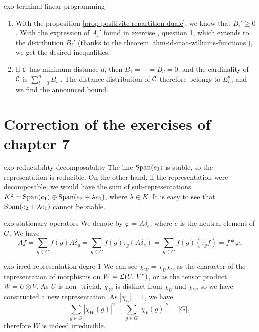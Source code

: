  
\begin{correction}{exo-terminal-linear-programming}
\begin{enumerate}
\item With the proposition \ref{prop-positivite-repartition-duale}, we know that $ B_i'\geq 0 $. With the expression of $ A_i'$ found in exercise , question 1, which extends to the distribution $ B_i' $ (thanks to the theorem \ref{thm-id-mac-williams-functions}), we get the desired inequalities.
\item If $ \mathcal{C} $ has minimum distance $ d $, then $ B_1 = \cdots = B_d = 0 $, and the cardinality of $ \mathcal{C} $ is $ \sum_{i = 0}^n{B_i} $ . The distance distribution of $ \mathcal{C} $ therefore belongs to $ E_n^d $, and we find the announced bound.
\end{enumerate}
\end{correction}

\section{Correction of the exercises of chapter 7}
 
 
\begin{correction}{exo-reductibility-decomposability}
 The line $ \operatorname{Span} (e_1) $ is stable, so the representation is reducible. On the other hand, if the representation were decomposable, we would have the sum of sub-representations $ K^2 = \operatorname{Span} (e_1) \oplus \operatorname{Span} (e_2 + \lambda e_1) $, where $ \lambda \in K $. It is easy to see that $ \operatorname{Span} (e_2 + \lambda e_1) $ cannot be stable.
\end{correction}
 
 
\begin{correction}{exo-stationary-operators}
We denote by $ \varphi = A \delta_e $, where $ e $ is the neutral element of $ G $. We have
\begin{equation*}
A f = \sum_{g \in G}{f(g) A \delta_g} = \sum_{g \in G}{f(g) \tau_{g} (A{\delta_e})} = \sum_{g \in G}{f(g) (\tau_g f)} = f * \varphi.
\end{equation*}
\end{correction}
 
 
\begin{correction}{exo-irred-representation-degre-1}   We can see $ \chi_W = \chi_U \chi_V $ as the character of the representation of morphisms on $ W = \mathcal{L} (U, \, V^*) $, or as the tensor product $ W = U \otimes V $. As $ U $ is non- trivial, $ \chi_W $ is distinct from $ \chi_U $ and $ \chi_V $, so we have constructed a new representation. As $ | \chi_U | = 1 $, we have
\begin{equation*}
\sum_{g \in G}{| \chi_W (g) |^2} = \sum_{g \in G}{| \chi_V (g) |^2} = |G|,
\end{equation*}
therefore $ W $ is indeed irreducible.
\end{correction}
 
